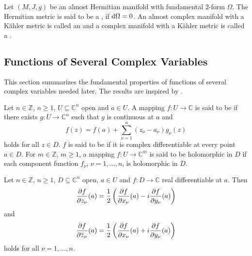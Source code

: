 \begin{definition}
Let $(M,J,g)$ be an almost Hermitian manifold with fundamental $2$-form $\Omega$. The Hermitian metric is said to be a , if $\mathop{}\!\mathrm{d} \Omega = 0$. An almost complex manifold with a K\"ahler metric is called an  and a complex manifold with a K\"ahler metric is called a .
\end{definition}

\begin{appendix}
\section{Functions of Several Complex Variables}
This section summarizes the fundamental properties of functions of several complex variables needed later. The results are inspired by \cite[14--30]{grauert:complex_manifolds:2010}.

\begin{definition}
Let $n \in \mathbb{Z}$, $n \geq 1$, $U \subseteq \mathbb{C}^n$ open and $a \in U$. A mapping $f : U \to \mathbb{C}$ is said to be  if there exists $g : U \to \mathbb{C}^n$ such that $g$ is continuous at $a$ and
\begin{equation}
f(z) = f(a) + \sum_{\nu = 1}^n(z_\nu - a_\nu)g_\nu(z)
\end{equation} 
\noindent holds for all $z \in D$. $f$ is said to be  if it is complex differentiable at every point $a \in D$. For $m \in \mathbb{Z}$, $m \geq 1$, a mapping $f : U \to \mathbb{C}^m$ is said to be holomorphic in $D$ if each component function $f_\nu$, $\nu = 1,\dots,n$, is holomorphic in $D$.
\label{def:holomorphic}
\end{definition}

\begin{proposition}
Let $n \in \mathbb{Z}$, $n \geq 1$, $D \subseteq \mathbb{C}^n$ open, $a \in U$ and $f : D \to \mathbb{C}$ real differentiable at $a$. Then
\begin{equation}
\frac{\partial f}{\partial z_\nu}(a) = \frac{1}{2}\del[3]{\frac{\partial f}{\partial x_\nu}(a) - i \frac{\partial f}{\partial y_\nu}(a)} 
\end{equation}
\noindent and
\begin{equation}
\frac{\partial f}{\partial \overline{z}_\nu}(a) = \frac{1}{2}\del[3]{\frac{\partial f}{\partial x_\nu}(a) + i \frac{\partial f}{\partial y_\nu}(a)}
\end{equation}  
\noindent holds for all $\nu = 1,\dots,n$.
\label{prop:Wirtinger}
\end{proposition}


\end{appendix}
